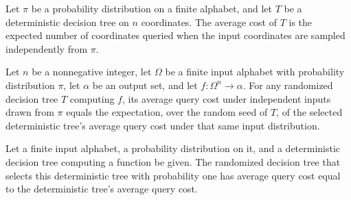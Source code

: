 \begin{definition}
\label{FABL.RandomizedDecisionTree.deterministicAverageCost}
\leanok
{}
Let $\pi$ be a probability distribution on a finite alphabet, and let $T$ be a
deterministic decision tree on $n$ coordinates. The average cost of $T$ is the expected
number of coordinates queried when the input coordinates are sampled independently from
$\pi$.
\end{definition}

\begin{theorem}
\label{FABL.RandomizedDecisionTree.averageCost_eq_seedExpectation}
\leanok
{}
Let $n$ be a nonnegative integer, let $\Omega$ be a finite input alphabet with
probability distribution $\pi$, let $\alpha$ be an output set, and let
$f:\Omega^n\to\alpha$. For any randomized decision tree $T$ computing $f$, its
average query cost under independent inputs drawn from $\pi$ equals the expectation,
over the random seed of $T$, of the selected deterministic tree's average query cost
under that same input distribution.
\end{theorem}

\begin{theorem}
\label{FABL.RandomizedDecisionTree.averageCost_ofDeterministic}
\leanok
{}
Let a finite input alphabet, a probability distribution on it, and a deterministic
decision tree computing a function be given. The randomized decision tree that selects
this deterministic tree with probability one has average query cost equal to the
deterministic tree’s average query cost.
\end{theorem}

